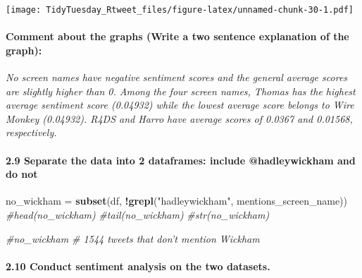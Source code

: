 \documentclass[]{article}
\newenvironment{Shaded}{\begin{snugshade}}{\end{snugshade}}
\newcommand{\CommentTok}[1]{\textcolor[rgb]{0.56,0.35,0.01}{\textit{#1}}}
\newcommand{\KeywordTok}[1]{\textcolor[rgb]{0.13,0.29,0.53}{\textbf{#1}}}
\newcommand{\NormalTok}[1]{#1}
\newcommand{\OperatorTok}[1]{\textcolor[rgb]{0.81,0.36,0.00}{\textbf{#1}}}
\newcommand{\StringTok}[1]{\textcolor[rgb]{0.31,0.60,0.02}{#1}}
\let\oldparagraph\paragraph
\renewcommand{\paragraph}[1]{\oldparagraph{#1}\mbox{}}
\begin{document}
\texttt{[image: TidyTuesday\_Rtweet\_files/figure-latex/unnamed-chunk-30-1.pdf]}

\hypertarget{comment-about-the-graphs-write-a-two-sentence-explanation-of-the-graph}{%
\paragraph{Comment about the graphs (Write a two sentence explanation of
the
graph):}\label{comment-about-the-graphs-write-a-two-sentence-explanation-of-the-graph}}

\emph{No screen names have negative sentiment scores and the general
average scores are slightly higher than 0. Among the four screen names,
Thomas has the highest average sentiment score (0.04932) while the
lowest average score belongs to Wire Monkey (0.04932). R4DS and Harro
have average scores of 0.0367 and 0.01568, respectively. }

\hypertarget{separate-the-data-into-2-dataframes-include-hadleywickham-and-do-not}{%
\paragraph{2.9 Separate the data into 2 dataframes: include
@hadleywickham and do
not}\label{separate-the-data-into-2-dataframes-include-hadleywickham-and-do-not}}

\begin{Shaded}
\end{Shaded}

\begin{Shaded}
\begin{Highlighting}[]
\NormalTok{no_wickham =}\StringTok{ }\KeywordTok{subset}\NormalTok{(df, }\OperatorTok{!}\KeywordTok{grepl}\NormalTok{(}\StringTok{"hadleywickham"}\NormalTok{, mentions_screen_name))}
\CommentTok{#head(no_wickham)}
\CommentTok{#tail(no_wickham)}
\CommentTok{#str(no_wickham)}

\CommentTok{#no_wickham # 1544 tweets that don't mention Wickham }
\end{Highlighting}
\end{Shaded}

\hypertarget{conduct-sentiment-analysis-on-the-two-datasets.}{%
\paragraph{2.10 Conduct sentiment analysis on the two
datasets.}\label{conduct-sentiment-analysis-on-the-two-datasets.}}
\end{document}
